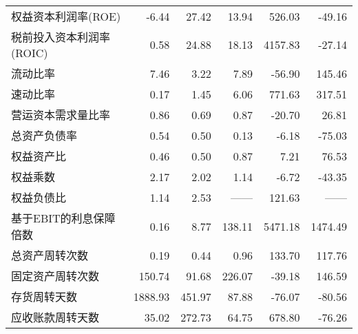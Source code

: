 \begin{longtable}{>{\footnotesize}l>{\footnotesize}r>{\footnotesize}r>{\footnotesize}r>{\footnotesize}r>{\footnotesize}r}
权益资本利润率(ROE)	& -6.44		& 27.42	& 	13.94	& 		526.03		& 		-49.16 \\
税前投入资本利润率(ROIC)	& 0.58	& 	24.88	& 	18.13	& 		4157.83		& 		-27.14 \\
\midrule
流动比率	& 7.46	& 3.22	& 	7.89	& 		-56.90		& 		145.46 \\
速动比率	& 0.17	& 1.45	& 	6.06	& 		771.63		& 		317.51 \\
营运资本需求量比率	& 0.86	& 	0.69	& 	0.87		& 	-20.70	& 			26.81 \\
\midrule
总资产负债率	& 0.54	& 	0.50	& 	0.13	& 		-6.18		& 		-75.03 \\
权益资产比	& 0.46	& 	0.50	& 	0.87	& 		7.21		& 		76.53 \\
权益乘数	& 2.17	& 	2.02	& 	1.14	& 		-6.72	& 			-43.35 \\
权益负债比	& 1.14	& 	2.53	& 	—— & 		121.63		& 	——	  \\
基于EBIT的利息保障倍数	& 0.16	& 	8.77	& 	138.11		& 	5471.18			& 	1474.49 \\
\midrule
总资产周转次数	& 0.19	& 		0.44	& 		0.96	& 			133.70		& 			117.76 \\
固定资产周转次数	& 150.74	& 		91.68	& 		226.07		& 		-39.18			& 		146.59 \\
存货周转天数	& 1888.93	& 		451.97	& 		87.88		& 		-76.07  & -80.56 \\
应收账款周转天数 & 	35.02	& 		272.73 &	64.75	& 			678.80		& 			-76.26 \\

\bottomrule
\end{longtable}
